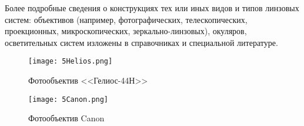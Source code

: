 Более подробные сведения о конструкциях тех или иных видов и типов линзовых систем: объективов (например, фотографических, телескопических, проекционных, микроскопических, зеркально-линзовых), окуляров, осветительных систем изложены в справочниках и специальной литературе.	
\begin{figure}[h!]
	\begin{center}
		\texttt{[image: 5Helios.png]}
		\caption{ Фотообъектив <<Гелиос-44Н>> }
		\label{pic:5helios}
	\end{center}
\end{figure}

\begin{figure*}[h!]
	\texttt{[image: 5Canon.png]}
	\label{pic:5Canon}
	\caption{ Фотообъектив Canon }
\end{figure*}
